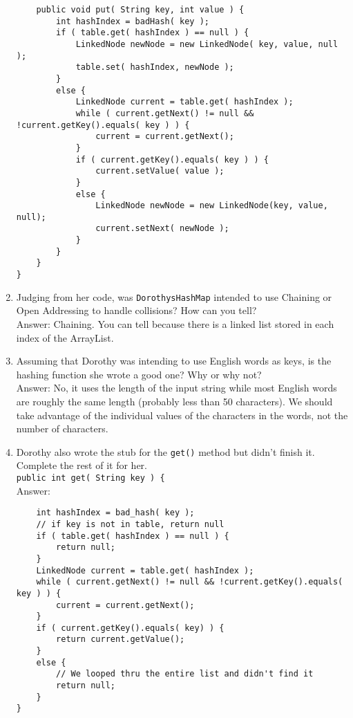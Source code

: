 \documentclass[11pt]{article}
\newenvironment{answer}{\large\lstset{basicstyle=\large\ttfamily}\color{white} \small{Answer:}\large}{}
\newenvironment{answer}{\large\lstset{basicstyle=\large\ttfamily}\color{red} \small{Answer:}\large}{}
\begin{document}
\begin{enumerate}
\begin{lstlisting}
	public void put( String key, int value ) {
		int hashIndex = badHash( key );
		if ( table.get( hashIndex ) == null ) {
			LinkedNode newNode = new LinkedNode( key, value, null );
			table.set( hashIndex, newNode );
		}
		else {
			LinkedNode current = table.get( hashIndex );
			while ( current.getNext() != null && !current.getKey().equals( key ) ) {
				current = current.getNext();
			}
			if ( current.getKey().equals( key ) ) {
				current.setValue( value );
			}
			else {
				LinkedNode newNode = new LinkedNode(key, value, null);
				current.setNext( newNode );
			}
		}
	}
}
\end{lstlisting}



\item Judging from her code, was {\tt DorothysHashMap} intended to use Chaining or Open Addressing to handle collisions? How can you tell? \\
\begin{answer}
Chaining. You can tell because there is a linked list stored in each index of the ArrayList.
\end{answer}



\item Assuming that Dorothy was intending to use English words as keys, is the hashing function she wrote a good one? Why or why not? \\
\begin{answer}
No, it uses the length of the input string while most English words are roughly the same length (probably less than 50 characters). We should take advantage of the individual values of the characters in the words, not the number of characters.  
\end{answer}



\item Dorothy also wrote the stub for the {\tt get()} method but didn't finish it. Complete the rest of it for her. \\
{\tt public int get( String key ) \{ } \\
\begin{answer} 
	\begin{lstlisting}
	int hashIndex = bad_hash( key );
	// if key is not in table, return null
	if ( table.get( hashIndex ) == null ) {
		return null;
	}
	LinkedNode current = table.get( hashIndex );
	while ( current.getNext() != null && !current.getKey().equals( key ) ) {
		current = current.getNext();
	}
	if ( current.getKey().equals( key) ) {
		return current.getValue();
	}
	else {
		// We looped thru the entire list and didn't find it
		return null;
	}
}
	\end{lstlisting}
\end{answer}



\end{enumerate}
\end{document}

